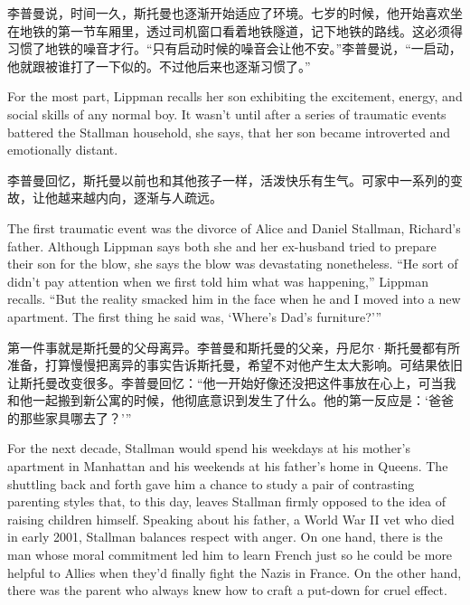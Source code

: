 \ifdefined\chs
李普曼说，时间一久，斯托曼也逐渐开始适应了环境。七岁的时候，他开始喜欢坐在地铁的第一节车厢里，透过司机窗口看着地铁隧道，记下地铁的路线。这必须得习惯了地铁的噪音才行。``只有启动时候的噪音会让他不安。''李普曼说，``一启动，他就跟被谁打了一下似的。不过他后来也逐渐习惯了。''
\fi

\ifdefined\eng
For the most part, Lippman recalls her son exhibiting the excitement, energy, and social skills of any normal boy. It wasn't until after a series of traumatic events battered the Stallman household, she says, that her son became introverted and emotionally distant.
\fi

\ifdefined\chs
李普曼回忆，斯托曼以前也和其他孩子一样，活泼快乐有生气。可家中一系列的变故，让他越来越内向，逐渐与人疏远。
\fi

\ifdefined\eng
The first traumatic event was the divorce of Alice and Daniel Stallman, Richard's father. Although Lippman says both she and her ex-husband tried to prepare their son for the blow, she says the blow was devastating nonetheless. ``He sort of didn't pay attention when we first told him what was happening,'' Lippman recalls. ``But the reality smacked him in the face when he and I moved into a new apartment. The first thing he said was, `Where's Dad's furniture?'\hspace{0.01in}''
\fi

\ifdefined\chs
第一件事就是斯托曼的父母离异。李普曼和斯托曼的父亲，丹尼尔·斯托曼都有所准备，打算慢慢把离异的事实告诉斯托曼，希望不对他产生太大影响。可结果依旧让斯托曼改变很多。李普曼回忆：``他一开始好像还没把这件事放在心上，可当我和他一起搬到新公寓的时候，他彻底意识到发生了什么。他的第一反应是：`爸爸的那些家具哪去了？'\hspace{0.01in}''
\fi

\ifdefined\eng
For the next decade, Stallman would spend his weekdays at his mother's apartment in Manhattan and his weekends at his father's home in Queens. The shuttling back and forth gave him a chance to study a pair of contrasting parenting styles that, to this day, leaves Stallman firmly opposed to the idea of raising children himself. Speaking about his father, a World War II vet who died in early 2001, Stallman balances respect with anger. On one hand, there is the man whose moral commitment led him to learn French just so he could be more helpful to Allies when they'd finally fight the Nazis in France. On the other hand, there was the parent who always knew how to craft a put-down for cruel effect.
\fi

